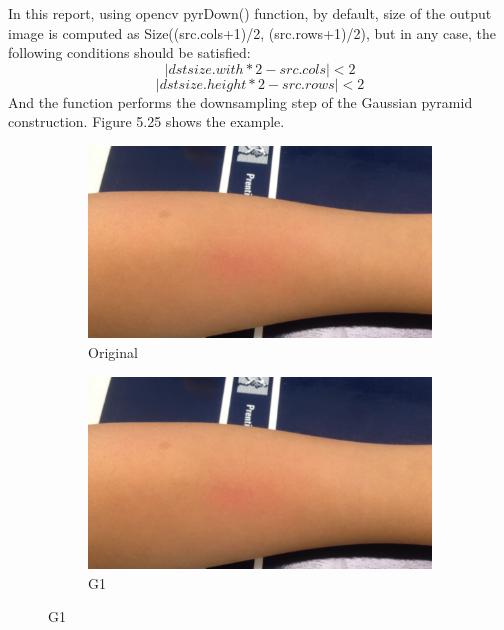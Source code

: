 In this report, using opencv pyrDown() function, by default, size of the output image is computed as Size((src.cols+1)/2, (src.rows+1)/2), but in any case, the following conditions should be satisfied:
\begin{displaymath}
\left | dstsize.with*2-src.cols \right | < 2 
\end{displaymath}
\begin{displaymath}
\left | dstsize.height*2-src.rows \right | < 2 
\end{displaymath}
And the function performs the downsampling step of the Gaussian pyramid construction. Figure 5.25 shows the example. 
 \begin{figure}[!h]
\centering
\begin{subfigure}{.6\textwidth}
  \centering
  \includegraphics[scale=0.16]{img/eulerian/sample/test}
  \caption{Original}
  \label{fig:sub1}
\end{subfigure}%
\begin{subfigure}{.6\textwidth}
  \centering
  \includegraphics[scale=0.16]{img/eulerian/sample/0}
  \caption{G1}
  \label{fig:sub2}
\end{subfigure}

\end{figure}
